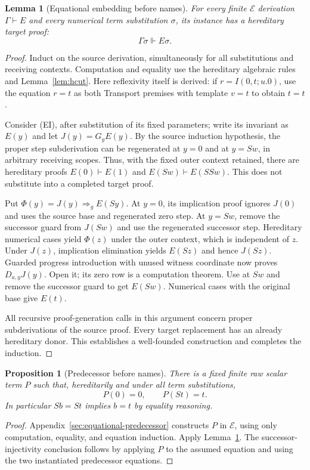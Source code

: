 \documentclass[11pt]{article}
\newtheorem{lemma}[theorem]{Lemma}
\newtheorem{proposition}[theorem]{Proposition}
\theoremstyle{definition}\newtheorem{definition}[theorem]{Definition}
\theoremstyle{remark}\newtheorem{remark}[theorem]{Remark}
\newcommand{\EE}{\mathcal E}
\begin{document}
\begin{lemma}[Equational embedding before names]
\label{lem:embed}
For every finite $\EE$ derivation $\Gamma\vdash E$ and every numerical
term substitution $\sigma$, its instance has a hereditary target proof:
\[
                       \Gamma\sigma\Vdash E\sigma.
\]
\end{lemma}
\begin{proof}
Induct on the source derivation, simultaneously for all substitutions
and receiving contexts. Computation and equality use the hereditary
algebraic rules and Lemma~\ref{lem:hcut}. Here reflexivity itself is
derived: if $r=I(0,t;u.0)$, use the equation $r=t$ as both Transport
premises with template $v=t$ to obtain $t=t$.

Consider (EI), after substitution of its fixed parameters; write its
invariant as $E(y)$ and let $J(y)=G_yE(y)$. By the source induction
hypothesis, the proper step subderivation can be regenerated at
$y=0$ and at $y=Sw$, in arbitrary receiving scopes. Thus, with the
fixed outer context retained, there are hereditary proofs
$E(0)\vdash E(1)$ and $E(Sw)\vdash E(SSw)$. This does not substitute
into a completed target proof.

Put $\Phi(y)=J(y)\Rightarrow_g E(Sy)$. At $y=0$, its implication
proof ignores $J(0)$ and uses the source base and regenerated zero
step. At $y=Sw$, remove the successor guard from $J(Sw)$ and use
the regenerated successor step. Hereditary numerical cases yield
$\Phi(z)$ under the outer context, which is independent of $z$.
Under $J(z)$, implication elimination yields $E(Sz)$ and hence
$J(Sz)$. Guarded progress introduction with unused witness coordinate
now proves $D_{a,y}J(y)$. Open it; its zero row is a computation
theorem. Use at $Sw$ and remove the successor guard to get $E(Sw)$.
Numerical cases with the original base give $E(t)$.

All recursive proof-generation calls in this argument concern proper
subderivations of the source proof. Every target replacement has an
already hereditary donor. This establishes a well-founded construction
and completes the induction.
\end{proof}

\begin{proposition}[Predecessor before names]
\label{prop:pred}
There is a fixed finite raw scalar term $P$ such that, hereditarily
and under all term substitutions,
\[
                 P(0)=0,\qquad P(St)=t.
\]
In particular $Sb=St$ implies $b=t$ by equality reasoning.
\end{proposition}
\begin{proof}
Appendix~\ref{sec:equational-predecessor} constructs $P$ in $\EE$,
using only computation, equality, and equation induction. Apply
Lemma~\ref{lem:embed}. The successor-injectivity conclusion follows
by applying $P$ to the assumed equation and using the two instantiated
predecessor equations.
\end{proof}
\end{document}

